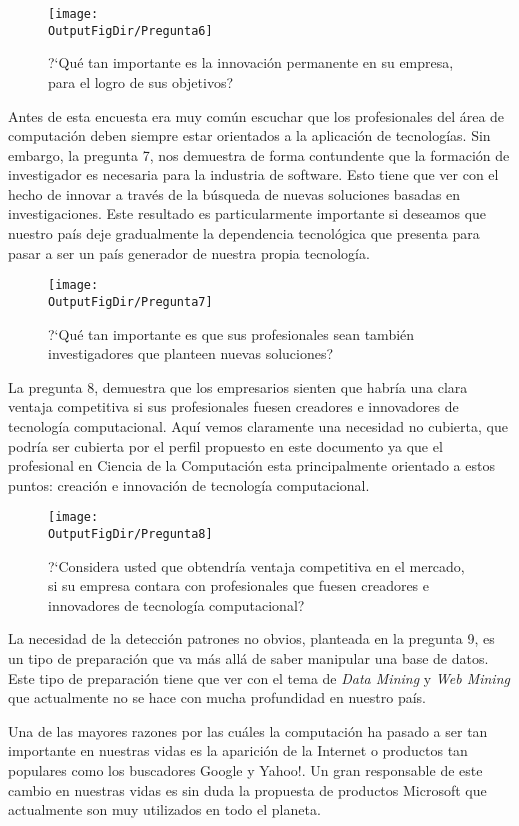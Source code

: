 \begin{figure}[!h]
	\centering
	\texttt{[image: \\OutputFigDir/Pregunta6]}
	\label{fig:Preg6}
	\caption{?`Qué tan importante es la innovación permanente en su empresa, para el logro de sus objetivos?}
\end{figure}

Antes de esta encuesta era muy común escuchar que los profesionales del área de computación deben siempre estar orientados a la aplicación de tecnologías. Sin embargo, la pregunta 7, nos demuestra de forma contundente que la formación de investigador es necesaria para la industria de software. Esto tiene que ver con el hecho de innovar a través de la búsqueda de nuevas soluciones basadas en investigaciones. Este resultado es particularmente importante si deseamos que nuestro país deje gradualmente la dependencia tecnológica que presenta para pasar a ser un país generador de nuestra propia tecnología.

\begin{figure}[!h]
	\centering
	\texttt{[image: \\OutputFigDir/Pregunta7]}
	\label{fig:Preg7}
	\caption{?`Qué tan importante es que sus profesionales sean también investigadores que planteen nuevas soluciones?}
\end{figure}

La pregunta 8, demuestra que los empresarios sienten que habría una clara ventaja competitiva si sus profesionales fuesen creadores e innovadores de tecnología computacional. Aquí vemos claramente una necesidad no cubierta, que podría ser cubierta por el perfil propuesto en este documento ya que el profesional en Ciencia de la Computación esta principalmente orientado a estos puntos: creación e innovación de tecnología computacional.

\begin{figure}[!h]
	\centering
	\texttt{[image: \\OutputFigDir/Pregunta8]}
	\label{fig:Preg8}
	\caption{?`Considera usted que obtendría ventaja competitiva en el mercado, si su empresa contara con profesionales que fuesen creadores e innovadores de tecnología computacional?}
\end{figure}

La necesidad de la detección patrones no obvios, planteada en la pregunta 9,  es un tipo de preparación que va más allá de saber manipular una base de datos. Este tipo de preparación tiene que ver con el tema de \textit{Data Mining} y \textit{Web Mining} que actualmente no se hace con mucha profundidad en nuestro país.

Una de las mayores razones por las cuáles la computación ha pasado a ser tan importante en nuestras vidas es la aparición de la Internet o productos tan populares como los buscadores Google y Yahoo!. Un gran responsable de este cambio en nuestras vidas es sin duda la propuesta de productos Microsoft que actualmente son muy utilizados en todo el planeta. 

